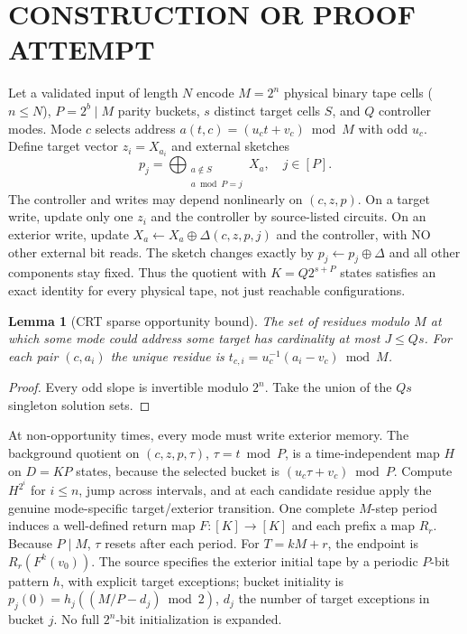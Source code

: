 \documentclass[11pt]{article}
\newtheorem{lemma}{Lemma}
\begin{document}
\section{CONSTRUCTION OR PROOF ATTEMPT}
Let a validated input of length $N$ encode $M=2^n$ physical binary tape cells ($n\le N$), $P=2^b\mid M$ parity buckets, $s$ distinct target cells $S$, and $Q$ controller modes. Mode $c$ selects address $a(t,c)=(u_ct+v_c)\bmod M$ with odd $u_c$. Define target vector $z_i=X_{a_i}$ and external sketches
\[
p_j=\bigoplus_{\substack{a\notin S\\a\bmod P=j}}X_a,\quad j\in[P].
\]
The controller and writes may depend nonlinearly on $(c,z,p)$. On a target write, update only one $z_i$ and the controller by source-listed circuits. On an exterior write, update $X_a\leftarrow X_a\oplus\Delta(c,z,p,j)$ and the controller, with NO other external bit reads. The sketch changes exactly by $p_j\leftarrow p_j\oplus\Delta$ and all other components stay fixed. Thus the quotient with $K=Q2^{s+P}$ states satisfies an exact identity for every physical tape, not just reachable configurations.
\begin{lemma}[CRT sparse opportunity bound]
The set of residues modulo $M$ at which some mode could address some target has cardinality at most $J\le Qs$. For each pair $(c,a_i)$ the unique residue is $t_{c,i}=u_c^{-1}(a_i-v_c)\bmod M$.
\end{lemma}
\begin{proof}Every odd slope is invertible modulo $2^n$. Take the union of the $Qs$ singleton solution sets.\end{proof}
At non-opportunity times, every mode must write exterior memory. The background quotient on $(c,z,p,\tau)$, $\tau=t\bmod P$, is a time-independent map $H$ on $D=KP$ states, because the selected bucket is $(u_c\tau+v_c)\bmod P$. Compute $H^{2^i}$ for $i\le n$, jump across intervals, and at each candidate residue apply the genuine mode-specific target/exterior transition. One complete $M$-step period induces a well-defined return map $F:[K]\to[K]$ and each prefix a map $R_r$. Because $P\mid M$, $\tau$ resets after each period. For $T=kM+r$, the endpoint is $R_r(F^k(v_0))$. The source specifies the exterior initial tape by a periodic $P$-bit pattern $h$, with explicit target exceptions; bucket initiality is $p_j(0)=h_j((M/P-d_j)\bmod2)$, $d_j$ the number of target exceptions in bucket $j$. No full $2^n$-bit initialization is expanded.
\end{document}
